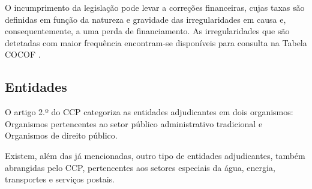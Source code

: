 O incumprimento da legislação pode levar a correções financeiras, cujas taxas são definidas em função da natureza e gravidade das irregularidades em causa e, consequentemente, a uma perda de financiamento. As irregularidades que são detetadas com maior frequência encontram-se disponíveis para consulta na Tabela COCOF \cite{corrections}.

\subsection{Entidades}

O artigo 2.º do CCP categoriza as entidades adjudicantes em dois organismos: Organismos pertencentes ao setor público administrativo tradicional e Organismos de direito público.


\begin{table}[h!]
	
	\centering
	\setlength{\tabcolsep}{15pt}
	\setlength\cellspacetoplimit{0.5cm} 
	\setlength\cellspacebottomlimit{0.5cm} 
	\renewcommand{\arraystretch}{1.5}

	
	\caption{Categorização das Entidades Adjudicantes}
	\label{table:1}
\end{table}



Existem, além das já mencionadas, outro tipo de entidades adjudicantes, também abrangidas pelo CCP, pertencentes aos setores especiais da água, energia, transportes e serviços postais. 

